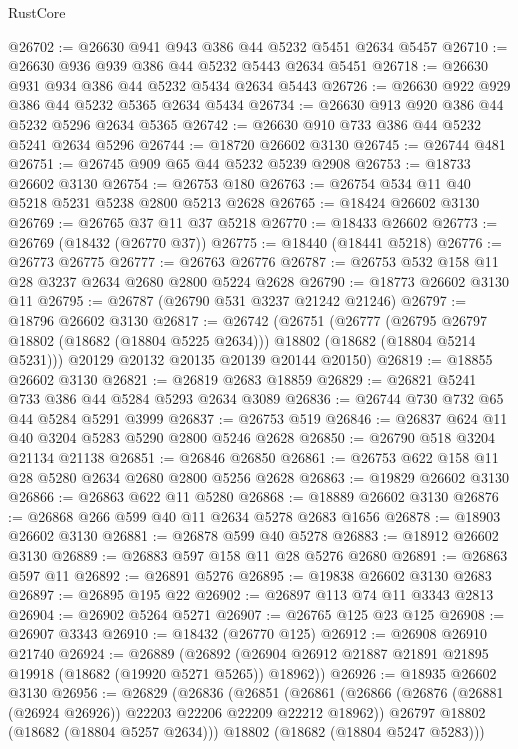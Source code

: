 \begin{lexlean}{RustCore}
\begin{coremodule}
@26702 := @26630 @941 @943 @386 @44 @5232 @5451 @2634 @5457
@26710 := @26630 @936 @939 @386 @44 @5232 @5443 @2634 @5451
@26718 := @26630 @931 @934 @386 @44 @5232 @5434 @2634 @5443
@26726 := @26630 @922 @929 @386 @44 @5232 @5365 @2634 @5434
@26734 := @26630 @913 @920 @386 @44 @5232 @5296 @2634 @5365
@26742 := @26630 @910 @733 @386 @44 @5232 @5241 @2634 @5296
@26744 := @18720 @26602 @3130
@26745 := @26744 @481
@26751 := @26745 @909 @65 @44 @5232 @5239 @2908
@26753 := @18733 @26602 @3130
@26754 := @26753 @180
@26763 := @26754 @534 @11 @40 @5218 @5231 @5238 @2800 @5213 @2628
@26765 := @18424 @26602 @3130
@26769 := @26765 @37 @11 @37 @5218
@26770 := @18433 @26602
@26773 := @26769 (@18432 (@26770 @37))
@26775 := @18440 (@18441 @5218)
@26776 := @26773 @26775
@26777 := @26763 @26776
@26787 := @26753 @532 @158 @11 @28 @3237 @2634 @2680 @2800 @5224 @2628
@26790 := @18773 @26602 @3130 @11
@26795 := @26787 (@26790 @531 @3237 @21242 @21246)
@26797 := @18796 @26602 @3130
@26817 := @26742
    (@26751
      (@26777
        (@26795 @26797 @18802 (@18682 (@18804 @5225 @2634)))
        @18802
        (@18682 (@18804 @5214 @5231)))
      @20129
      @20132
      @20135
      @20139
      @20144
      @20150)
@26819 := @18855 @26602 @3130
@26821 := @26819 @2683 @18859
@26829 := @26821 @5241 @733 @386 @44 @5284 @5293 @2634 @3089
@26836 := @26744 @730 @732 @65 @44 @5284 @5291 @3999
@26837 := @26753 @519
@26846 := @26837 @624 @11 @40 @3204 @5283 @5290 @2800 @5246 @2628
@26850 := @26790 @518 @3204 @21134 @21138
@26851 := @26846 @26850
@26861 := @26753 @622 @158 @11 @28 @5280 @2634 @2680 @2800 @5256 @2628
@26863 := @19829 @26602 @3130
@26866 := @26863 @622 @11 @5280
@26868 := @18889 @26602 @3130
@26876 := @26868 @266 @599 @40 @11 @2634 @5278 @2683 @1656
@26878 := @18903 @26602 @3130
@26881 := @26878 @599 @40 @5278
@26883 := @18912 @26602 @3130
@26889 := @26883 @597 @158 @11 @28 @5276 @2680
@26891 := @26863 @597 @11
@26892 := @26891 @5276
@26895 := @19838 @26602 @3130 @2683
@26897 := @26895 @195 @22
@26902 := @26897 @113 @74 @11 @3343 @2813
@26904 := @26902 @5264 @5271
@26907 := @26765 @125 @23 @125
@26908 := @26907 @3343
@26910 := @18432 (@26770 @125)
@26912 := @26908 @26910 @21740
@26924 := @26889
    (@26892 (@26904 @26912 @21887 @21891 @21895 @19918 (@18682 (@19920 @5271 @5265)) @18962))
@26926 := @18935 @26602 @3130
@26956 := @26829
    (@26836
      (@26851
        (@26861
          (@26866 (@26876 (@26881 (@26924 @26926)) @22203 @22206 @22209 @22212 @18962))
          @26797
          @18802
          (@18682 (@18804 @5257 @2634)))
        @18802
        (@18682 (@18804 @5247 @5283)))

\end{coremodule}
\end{lexlean}
